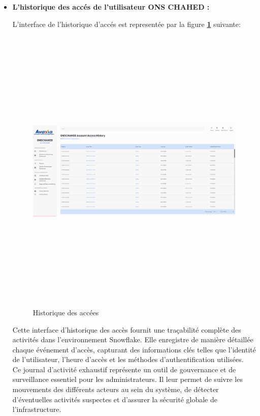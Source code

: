 \begin{itemize}
        \item \textbf{L'historique des accés de l'utilisateur ONS CHAHED :}
        \par L'interface de l'historique d'accés est representée par la figure \textbf{\ref{fig:accesslist}} suivante:
        \begin{figure}[H]
            \centering
            \includegraphics[width =1\linewidth,height =14cm]{img/captures/user/history.png}
            \caption{Historique des accées}
                \label{fig:accesslist}
            \end{figure}
            \par Cette interface d'historique des accès fournit une traçabilité complète des activités dans l'environnement Snowflake. 
            Elle enregistre de manière détaillée chaque événement d'accès, capturant des informations clés telles que l'identité de l'utilisateur, l'heure d'accès et les méthodes d'authentification utilisées. \\
            Ce journal d'activité exhaustif représente un outil de gouvernance et de surveillance essentiel pour les administrateurs. 
            Il leur permet de suivre les mouvements des différents acteurs au sein du système, de détecter d'éventuelles activités suspectes et d'assurer la sécurité globale de l'infrastructure.

\end{itemize}
